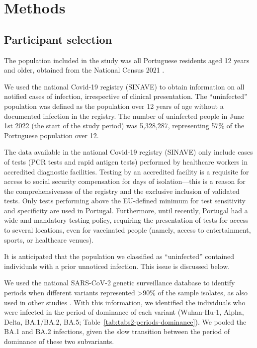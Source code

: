 \section{Methods}

\subsection{Participant selection}

The population included in the study was all Portuguese residents aged 12 years and older, obtained from the National Census 2021 \citep{institutonacionaldeestatistica2022StatisticsPortugal}.

We used the national Covid-19 registry (SINAVE) to obtain information on all notified cases of infection, irrespective of clinical presentation. The ``uninfected'' population was defined as the population over 12 years of age without a documented infection in the registry. The number of uninfected people in June 1st 2022 (the start of the study period) was 5,328,287, representing 57\% of the Portuguese population over 12.

The data available in the national Covid-19 registry (SINAVE) only include cases of tests (PCR tests and rapid antigen tests) performed by healthcare workers in accredited diagnostic facilities. Testing by an accredited facility is a requisite for access to social security compensation for days of isolation---this is a reason for the comprehensiveness of the registry and the exclusive inclusion of validated tests. Only tests performing above the EU-defined minimum for test sensitivity and specificity are used in Portugal. Furthermore, until recently, Portugal had a wide and mandatory testing policy, requiring the presentation of tests for access to several locations, even for vaccinated people (namely, access to entertainment, sports, or healthcare venues).

It is anticipated that the population we classified as ``uninfected'' contained individuals with a prior unnoticed infection. This issue is discussed below.

We used the national SARS-CoV-2 genetic surveillance database \citep{institutonacionaldesaudedoutorricardojorge2022GeneticDiversity} to identify periods when different variants represented >90\% of the sample isolates, as also used in other studies \citep{altarawneh2022ProtectionSARSCoV2}. With this information, we identified the individuals who were infected in the period of dominance of each variant (Wuhan-Hu-1, Alpha, Delta, BA.1/BA.2, BA.5; Table~\ref{tab:tabs2-periods-dominance}). We pooled the BA.1 and BA.2 infections, given the slow transition between the period of dominance of these two subvariants.

